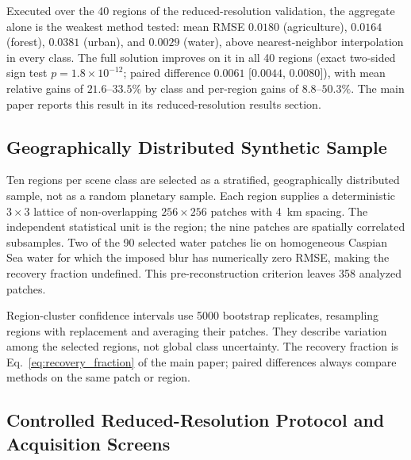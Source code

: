 \documentclass[journal]{IEEEtran}
\begin{document}
Executed over the 40 regions of the reduced-resolution validation, the
aggregate alone is the weakest method tested: mean RMSE $0.0180$
(agriculture), $0.0164$ (forest), $0.0381$ (urban), and $0.0029$ (water),
above nearest-neighbor interpolation in every class. The full solution
improves on it in all 40 regions (exact two-sided sign test
$p=1.8\times10^{-12}$; paired difference $0.0061$ [$0.0044$, $0.0080$]),
with mean relative gains of $21.6$--$33.5\%$ by class and per-region gains
of $8.8$--$50.3\%$. The main paper reports this result in its
reduced-resolution results section.

\subsection{Geographically Distributed Synthetic Sample}

Ten regions per scene class are selected as a stratified, geographically
distributed sample, not as a random planetary sample. Each region supplies a
deterministic $3\times3$ lattice of non-overlapping $256\times256$ patches
with 4~km spacing. The independent statistical unit is the region; the nine
patches are spatially correlated subsamples. Two of the 90 selected water
patches lie on homogeneous Caspian Sea water for which the imposed blur has
numerically zero RMSE, making the recovery fraction undefined. This
pre-reconstruction criterion leaves 358 analyzed patches.

Region-cluster confidence intervals use 5000 bootstrap replicates, resampling
regions with replacement and averaging their patches. They describe
variation among the selected regions, not global class uncertainty. The
recovery fraction is Eq.~\eqref{eq:recovery_fraction} of the main paper;
paired differences always compare methods on the same patch or region.

\subsection{Controlled Reduced-Resolution Protocol and Acquisition Screens}
\end{document}
